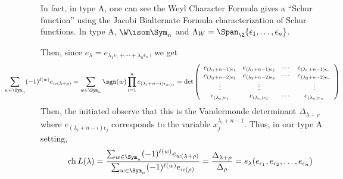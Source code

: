 \documentclass[11pt,leqno,oneside]{amsart}
\numberwithin{thm}{section}
\newcommand{\weightlattice}{\Lambda_W}
\newcommand{\ch}{\operatorname{ch}}
\begin{document}
\begin{rmk}
  In fact, in type A, one can see the Weyl Character Formula gives a
  ``Schur function'' using the Jacobi Bialternate Formula
  characterization of Schur functions. In type A, \(\W \isom
  \Sym_n\) and \(\weightlattice = \Span_\Z\{\epsilon_1, \ldots,
  \epsilon_n\}\). 

  Then, since \(e_{\lambda} = e_{\lambda_1 \epsilon_1 + \cdots +
    \lambda_n \epsilon_n}\), we get \[
    \hspace{-0.75in} \sum_{w \in \Sym_n} (-1)^{\ell(w)} e_{w(\lambda+\rho)}
    = \sum_{w \in \Sym_n} \sgn(w) \prod_{i=1}^n
    e_{(\lambda_i+n-i)\epsilon_{w(i)}} = \det \left(
      \begin{array}{cccc}
        e_{(\lambda_1+n-1)\epsilon_1}&e_{(\lambda_1+n-1)\epsilon_2}&\cdots
        &e_{(\lambda_1+n-1)\epsilon_n}\\
        e_{(\lambda_2+n-2)\epsilon_1}&e_{(\lambda_2+n-2)\epsilon_2}&\cdots
        &e_{(\lambda_2+n-2)\epsilon_n}\\
        \vdots&\vdots&&\vdots\\
        e_{(\lambda_n)\epsilon_1}&e_{(\lambda_n)\epsilon_2}&\cdots
        &e_{(\lambda_n)\epsilon_n}
      \end{array}
    \right)
\]
Then, the initiated observe that this is the Vandermonde determinant
\(\Delta_{\lambda+\rho}\) where \(e_{(\lambda_i+n-i)\epsilon_j}\)
corresponds to the variable \(x_j^{\lambda_i+n-1}\). Thus, in our type
A setting, \[
\ch L(\lambda) = \frac{\sum_{w \in \Sym_n} (-1)^{\ell(w)} e_{w(\lambda+\rho)}}{\sum_{w
    \in \Sym_n} (-1)^{\ell(w)} e_{w(\rho)}} =
\frac{\Delta_{\lambda+\rho}}{\Delta_{\rho}} =
s_\lambda(e_{\epsilon_1}, e_{\epsilon_2}, \ldots, e_{\epsilon_n})
\]
\end{rmk}
\end{document}
